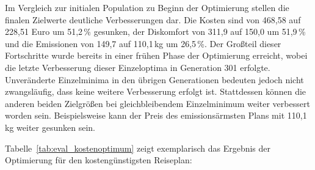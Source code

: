 Im Vergleich zur initialen Population zu Beginn der Optimierung stellen die finalen Zielwerte deutliche Verbesserungen dar. Die Kosten sind von 468,58 auf 228,51 Euro um 51,2\,\% gesunken, der Diskomfort von 311,9 auf 150,0 um 51,9\,\% und die Emissionen von 149,7 auf 110,1\,kg um 26,5\,\%. Der Großteil dieser Fortschritte wurde bereits in einer frühen Phase der Optimierung erreicht, wobei die letzte Verbesserung dieser Einzeloptima in Generation 301 erfolgte. Unveränderte Einzelminima in den übrigen Generationen bedeuten jedoch nicht zwangsläufig, dass keine weitere Verbesserung erfolgt ist. Stattdessen können die anderen beiden Zielgrößen bei gleichbleibendem Einzelminimum weiter verbessert worden sein. Beispielsweise kann der Preis des emissionsärmsten Plans mit 110,1\,kg weiter gesunken sein.

Tabelle~\ref{tab:eval_kostenoptimum} zeigt exemplarisch das Ergebnis der Optimierung für den kostengünstigsten Reiseplan:

\begin{table}[H] 
\centering 
\scriptsize 
\setlength{\tabcolsep}{3pt}
\renewcommand{\arraystretch}{1.2} 
\caption{Plan mit niedrigsten Reisekosten}
\label{tab:eval_kostenoptimum} 
\end{table}


